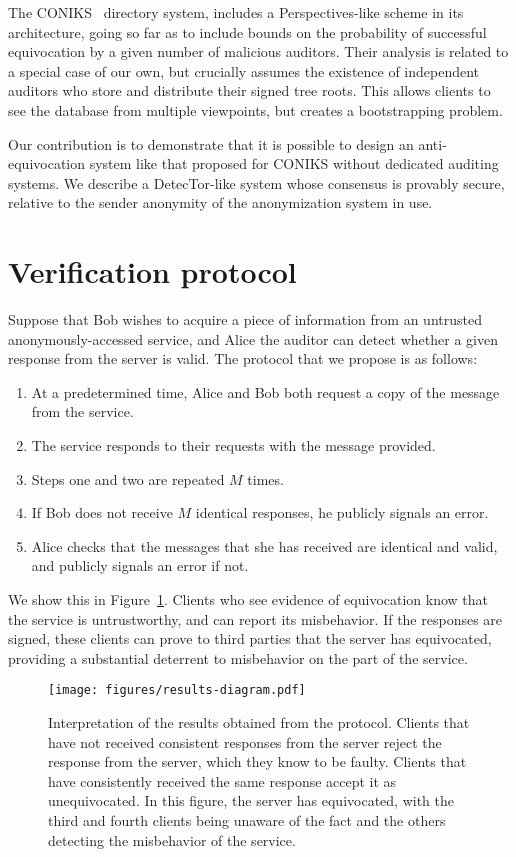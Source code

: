 \documentclass[USenglish]{llncs}
\begin{document}
The CONIKS~\cite{coniks} directory system, includes a Perspectives-like scheme in its architecture,
going so far as to include bounds on the probability of successful equivocation by a
given number of malicious auditors.  Their analysis is related to a special case of our own,
but crucially assumes the existence of independent auditors who store and distribute their signed
tree roots.  This allows clients to see the database from multiple viewpoints, but creates a
bootstrapping problem.

Our contribution is to demonstrate that it is possible to design an anti-equivocation system
like that proposed for CONIKS without dedicated auditing systems.  We describe a
DetecTor-like system whose consensus is provably secure, relative to the sender
anonymity of the anonymization system in use.

\section{Verification protocol}\label{sec:protocol}

Suppose that Bob wishes to acquire a piece of information from an untrusted anonymously-accessed
service, and Alice the auditor can detect whether a given response from the server is valid.
The protocol that we propose is as follows:
\begin{enumerate}
	\item At a predetermined time, Alice and Bob both request a copy of the message
		from the service.
	\item The service responds to their requests with the message provided.
	\item Steps one and two are repeated $M$ times.
	\item If Bob does not receive $M$ identical responses, he publicly signals an error.
	\item Alice checks that the messages that she has received are identical and valid,
			and publicly signals an error if not.
\end{enumerate}
We show this in Figure~\ref{fig:results-diagram}.  Clients who see evidence of equivocation
know that the service is untrustworthy, and can report its misbehavior.  If the responses
are signed, these clients can prove to third parties that the server has equivocated,
providing a substantial deterrent to misbehavior on the part of the service.

\begin{figure}
	\centering
	\texttt{[image: figures/results-diagram.pdf]}
	\caption{Interpretation of the results obtained from the protocol.  Clients that
			have not received consistent responses from the server reject
			the response from the server, which they know to be faulty.
			Clients that have consistently received the same response accept
			it as unequivocated.  In this figure, the server has equivocated,
			with the third and fourth clients being unaware of the fact and the
			others detecting the misbehavior of the service.}
	\label{fig:results-diagram}
\end{figure}
\end{document}
